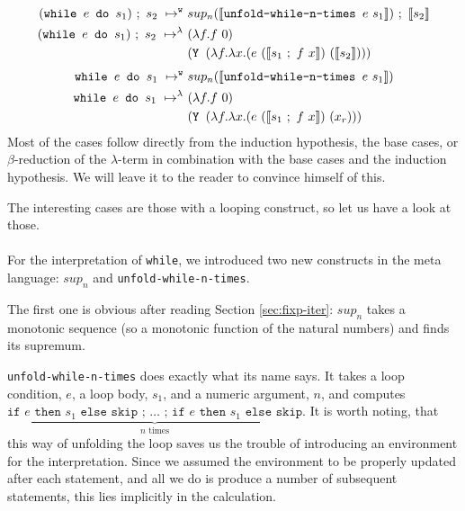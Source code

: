 \documentclass[11pt, leqno, titlepage]{article}
\theoremstyle{definition}
\begin{document}
\begin{align}
  (\texttt{while } e \texttt{ do } s_1) ~;~ s_2
  ~\mapsto^{\texttt{w}}~ & sup_n(\llbracket \texttt{unfold-while-n-times }e~s_1
                \rrbracket) ~;~\llbracket s_2\rrbracket \\
  (\texttt{while } e \texttt{ do } s_1) ~;~ s_2
  ~\mapsto^\lambda~ & (\lambda f. f~0)\notag\\
                         &(\texttt{Y }(\lambda f.\lambda x.(e~(\llbracket
                           s_1~;~f~x\rrbracket) ~(\llbracket s_2\rrbracket )))\notag
\end{align}
\begin{align}
  \texttt{while } e \texttt{ do } s_1
  ~\mapsto^{\texttt{w}}~ & sup_n(\llbracket \texttt{unfold-while-n-times }e~s_1 \rrbracket)\\
  \texttt{while } e \texttt{ do } s_1
  ~\mapsto^\lambda~ & (\lambda f. f~0)\notag\\
                         &(\texttt{Y }(\lambda f.\lambda x.(e~(\llbracket
                           s_1~;~f~x\rrbracket) ~(x_r)))\notag
\end{align}
Most of the cases follow directly from the induction hypothesis, the base cases, or
$\beta$-reduction of the $\lambda$-term in combination with the base cases and the
induction hypothesis. We will leave it to the reader to convince himself of this.

The interesting cases are those with a looping construct, so let us have a look at
those.\\
\\
For the interpretation of \texttt{while}, we introduced two new constructs in the
meta language: $sup_n$ and \texttt{unfold-while-n-times}.

The first one is obvious after reading Section \ref{sec:fixp-iter}: $sup_n$ takes a
monotonic sequence (so a monotonic function of the natural numbers) and finds its
supremum.

\texttt{unfold-while-n-times} does exactly what its name says. It takes a loop
condition, $e$, a loop body, $s_1$, and a numeric argument, $n$, and computes
$\underbrace{\texttt{if $e$ then $s_1$ else skip ; $\dots$ ; if $e$ then $s_1$ else
    skip}}_{n\text{ times}}$. It is worth noting, that this way of unfolding the loop
saves us the trouble of introducing an environment for the interpretation. Since we
assumed the environment to be properly updated after each statement, and all we do is
produce a number of subsequent statements, this lies implicitly in the calculation. 
\end{document}
